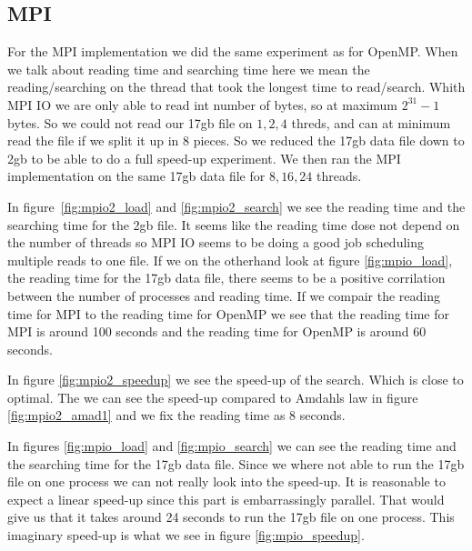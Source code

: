 \documentclass[a4paper,10pt]{article}
\begin{document}
\clearpage
\subsection{MPI}
  For the MPI implementation we did the same experiment as for OpenMP. When we talk about
  reading time and searching time here we mean the reading/searching on the thread that
  took the longest time to read/search.
  Whith MPI IO we are only able to read int number of bytes, so at maximum $2^{31}-1$ bytes.
  So we could not read our 17gb file on $1,2,4$ threds, and can at minimum read the file if we
  split it up in 8  pieces.  So we reduced the 17gb data file down to 2gb to be able to do a full
  speed-up experiment.  We then ran the MPI implementation on the same 17gb data file for 
  $8,16,24$ threads.

  In figure~\ref{fig:mpio2_load} and \ref{fig:mpio2_search} we see the reading time and
  the searching time for the 2gb file.  It seems like the reading time dose not depend
  on the number of threads so MPI IO seems to be doing a good job scheduling multiple 
  reads to one file.  If we on the otherhand look at figure \ref{fig:mpio_load}, 
  the reading time for the 17gb data file, there seems to be a positive corrilation
  between the number of processes and reading time. If we compair the reading time
  for MPI to the reading time for OpenMP we see that the reading time
  for MPI is around 100 seconds and the reading time for OpenMP is around 60 seconds.
  

  In figure \ref{fig:mpio2_speedup} we see the speed-up of the search.  Which is
  close to optimal.  The we can see the speed-up compared to Amdahls law in figure \ref{fig:mpio2_amad1}
  and we fix the reading time as $8$ seconds.

  In figures \ref{fig:mpio_load} and \ref{fig:mpio_search} we can see the reading time and 
  the searching time for the 17gb data file.  Since we where not able to run the 17gb file 
  on one process we can not really look into the speed-up.  
  It is reasonable to expect a linear speed-up since this part is embarrassingly parallel.
  That would give us that it takes around 24 seconds to run the 17gb file on one process.
  This imaginary speed-up is what we see in figure \ref{fig:mpio_speedup}.
\end{document}
